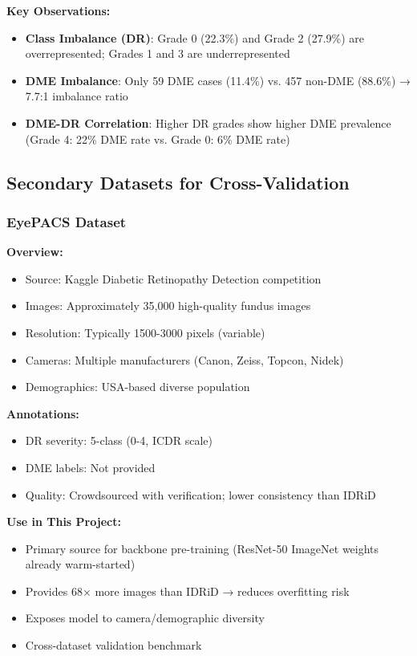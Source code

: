 \documentclass[12pt,a4paper]{article}
\begin{document}
\textbf{Key Observations:}
\begin{itemize}
    \item \textbf{Class Imbalance (DR)}: Grade 0 (22.3\%) and Grade 2 (27.9\%) are overrepresented; Grades 1 and 3 are underrepresented
    \item \textbf{DME Imbalance}: Only 59 DME cases (11.4\%) vs. 457 non-DME (88.6\%) → 7.7:1 imbalance ratio
    \item \textbf{DME-DR Correlation}: Higher DR grades show higher DME prevalence (Grade 4: 22\% DME rate vs. Grade 0: 6\% DME rate)
\end{itemize}

\subsection{Secondary Datasets for Cross-Validation}

\subsubsection{EyePACS Dataset}

\textbf{Overview:}
\begin{itemize}
    \item Source: Kaggle Diabetic Retinopathy Detection competition
    \item Images: Approximately 35,000 high-quality fundus images
    \item Resolution: Typically 1500-3000 pixels (variable)
    \item Cameras: Multiple manufacturers (Canon, Zeiss, Topcon, Nidek)
    \item Demographics: USA-based diverse population
\end{itemize}

\textbf{Annotations:}
\begin{itemize}
    \item DR severity: 5-class (0-4, ICDR scale)
    \item DME labels: Not provided
    \item Quality: Crowdsourced with verification; lower consistency than IDRiD
\end{itemize}

\textbf{Use in This Project:}
\begin{itemize}
    \item Primary source for backbone pre-training (ResNet-50 ImageNet weights already warm-started)
    \item Provides 68× more images than IDRiD → reduces overfitting risk
    \item Exposes model to camera/demographic diversity
    \item Cross-dataset validation benchmark
\end{itemize}
\end{document}
